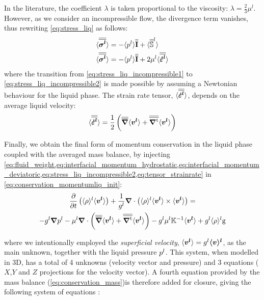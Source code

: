 In the literature, the coefficient $\lambda$ is taken proportional to the 
viscosity: $\lambda = \frac{2}{3} \mu^l $. However, as we consider an incompressible flow, the divergence 
term vanishes, thus rewriting \cref{eq:stress_liq} as follows:
\begin{subequations} 
\begin{align}
\label{eq:stress_liq_incompressible1}
& \avg{\sigmal} = - \avg{\pl} \I + \avg{\mat{\mathbb{S}}^{l}} \\
\label{eq:stress_liq_incompressible2}
& \avg{\sigmal} = - \avg{\pl} \I + 2 \mul \strainrateliq 
\end{align}
\end{subequations}
where the transition from \cref{eq:stress_liq_incompressible1} to \cref{eq:stress_liq_incompressible2} is made
possible by assuming a Newtonian behaviour for the liquid phase. The strain rate tensor, $\langle {\overline{\overline{\ensuremath{\boldsymbol{\dot{\varepsilon}^l}}}}} \rangle$, depends on 
the average liquid velocity:
\begin{align}
\label{eq:tensor_strainrate}
\strainrateliq = \frac{1}{2} \brac{\nabmat \vit  +  \nabmattransp \vit}
\end{align}

Finally, we obtain the final form of momentum conservation in the liquid phase coupled with the averaged 
mass balance, by injecting \cref{eq:fluid_weight,eq:interfacial_momentum_hydrostatic,eq:interfacial_momentum_deviatoric,eq:stress_liq_incompressible2,eq:tensor_strainrate}
in \cref{eq:conservation_momentumliq_init}:
\begin{multline}
\label{eq:conservation_momentumliq}
 \temp{ \rhol \vit } + \frac{1}{\gl} \nabvec \cdot \brac{\rhol \vit \times \vit} = \\
	  - \gl\nabvec \pl - \mul \nabvec \cdot \brac{\nabmat \vit + \nabmattransp \vit}
	  - \gl \mul \K^{-1} \vit + \gl \rhol \gravity
\end{multline}

where we intentionally employed the \emph{superficial velocity}, $\langle \boldsymbol{v^l} \rangle = {g^l} \boldsymbol{\langle v \rangle^l}$, as the main unknown, together with the liquid pressure ${p^l}$.
This system, when modelled in 3D, has a total of 4 unknowns (velocity vector and pressure) and 3 equations ($X$,$Y$ and $Z$ projections for the velocity vector).
A fourth equation provided by the mass balance (\cref{eq:conservation_mass})is therefore added for closure, giving the following system of equations :

